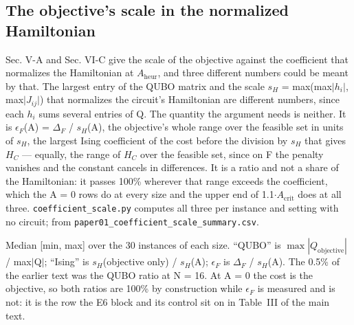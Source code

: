 \documentclass[journal]{IEEEtran}
\begin{document}
\subsection{The objective's scale in the normalized Hamiltonian}


Sec. V-A and Sec. VI-C give the scale of the objective against the coefficient that normalizes the Hamiltonian at $A_{\mathrm{heur}}$, and three different numbers could be meant by that. The largest entry of the QUBO matrix and the scale $s_{H}$ = max(max$|$$h_{i}$$|$, max$|$$J_{ij}$$|$) that normalizes the circuit's Hamiltonian are different numbers, since each $h_{i}$ sums several entries of Q. The quantity the argument needs is neither. It is $\epsilon_{F}$(A) = $\Delta_{F}$ / $s_{H}$(A), the objective's whole range over the feasible set in units of $s_{H}$, the largest Ising coefficient of the cost before the division by $s_{H}$ that gives $H_{C}$ --- equally, the range of $H_{C}$ over the feasible set, since on F the penalty vanishes and the constant cancels in differences. It is a ratio and not a share of the Hamiltonian: it passes 100\% wherever that range exceeds the coefficient, which the A = 0 rows do at every size and the upper end of 1.1$\cdot$$A_{\mathrm{crit}}$ does at all three. \texttt{coefficient\_scale.py} computes all three per instance and setting with no circuit; from \texttt{paper01\_coefficient\_scale\_summary.csv}.


Median [min, max] over the 30 instances of each size. ``QUBO'' is $\max|Q_{\mathrm{objective}}|$ / max$|$Q$|$; ``Ising'' is $s_{H}$(objective only) / $s_{H}$(A); $\epsilon_{F}$ is $\Delta_{F}$ / $s_{H}$(A). The 0.5\% of the earlier text was the QUBO ratio at N = 16. At A = 0 the cost is the objective, so both ratios are 100\% by construction while $\epsilon_{F}$ is measured and is not: it is the row the E6 block and its control sit on in Table~III of the main text.
\end{document}
